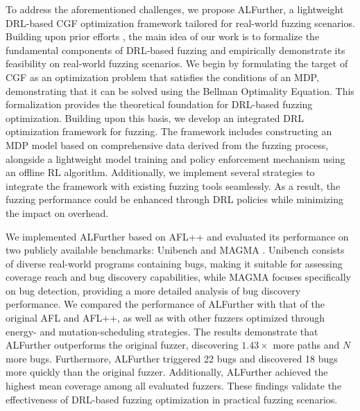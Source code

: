 \documentclass[lettersize,journal]{IEEEtran}
\begin{document}
To address the aforementioned challenges, we propose ALFurther, a lightweight DRL-based CGF optimization framework tailored for real-world fuzzing scenarios. Building upon prior efforts \cite {binosiRainfuzzReinforcementlearningDriven2023, liangRLFDirectedFuzzing2022, bottingerDeepReinforcementFuzzing2018}, the main idea of our work is to formalize the fundamental components of DRL‑based fuzzing and empirically demonstrate its feasibility on real‑world fuzzing scenarios. We begin by formulating the target of CGF as an optimization problem that satisfies the conditions of an MDP, demonstrating that it can be solved using the Bellman Optimality Equation. This formalization provides the theoretical foundation for DRL-based fuzzing optimization. Building upon this basis, we develop an integrated DRL optimization framework for fuzzing. The framework includes constructing an MDP model based on comprehensive data derived from the fuzzing process, alongside a lightweight model training and policy enforcement mechanism using an offline RL algorithm. Additionally, we implement several strategies to integrate the framework with existing fuzzing tools seamlessly. As a result, the fuzzing performance could be enhanced through DRL policies while minimizing the impact on overhead.

We implemented ALFurther based on AFL++ and evaluated its performance on two publicly available benchmarks: Unibench \cite{liUNIFUZZHolisticPragmatic2021} and MAGMA \cite{hazimehMagmaGroundtruthFuzzing2021}. Unibench consists of diverse real-world programs containing bugs, making it suitable for assessing coverage reach and bug discovery capabilities, while MAGMA focuses specifically on bug detection, providing a more detailed analysis of bug discovery performance. We compared the performance of ALFurther with that of the original AFL and AFL++, as well as with other fuzzers optimized through energy- and mutation-scheduling strategies. The results demonstrate that ALFurther outperforms the original fuzzer, discovering $1.43\times$ more paths and $N$ more bugs. Furthermore, ALFurther triggered 22 bugs and discovered 18 bugs more quickly than the original fuzzer. Additionally, ALFurther achieved the highest mean coverage among all evaluated fuzzers. These findings validate the effectiveness of DRL-based fuzzing optimization in practical fuzzing scenarios.
\end{document}
